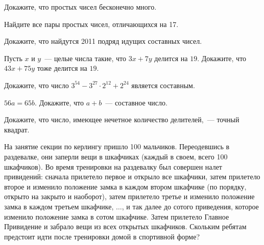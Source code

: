\begin{problems}
\item
Докажите, что простых чисел бесконечно много.

\item
Найдите все пары простых чисел, отличающихся на 17.

\item
Докажите, что найдутся 2011 подряд идущих составных чисел.

\item
Пусть $x$ и $y$~--- целые числа такие, что $3 x + 7 y$ делится на $19$.
Докажите, что $43 x + 75 y$ тоже делится на $19$.

\item
Докажите, что число $3^{54} - 3^{27} \cdot 2^{12} + 2^{24}$ является составным.

\item
$56 a = 65 b$.
Докажите, что $a + b$~--- составное число.

\item
Докажите, что число, имеющее нечетное количество делителей,~--- точный квадрат.

\item
На занятие секции по керлингу пришло 100 мальчиков.
Переодевшись в раздевалке, они заперли вещи в шкафчиках
(каждый в своем, всего 100 шкафчиков).
Во время тренировки на раздевалку был совершен налет привидений: сначала
прилетело первое и открыло все шкафчики, затем прилетело второе и изменило
положение замка в каждом втором шкафчике
(по порядку, открыто на закрыто и наоборот),
затем прилетело третье и изменило положение замка в каждом третьем шкафчике,
$\ldots$, и так далее до сотого приведения, которое изменило положение замка в
сотом шкафчике.
Затем прилетело Главное Привидение и забрало вещи из всех открытых шкафчиков.
Скольким ребятам предстоит идти после тренировки домой в спортивной форме?

\end{problems}

